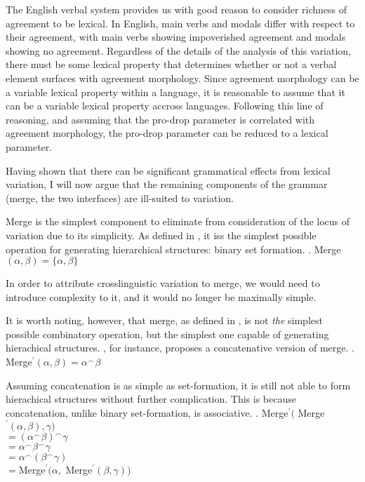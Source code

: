 \documentclass[MilwayThesis]{subfiles}
\begin{document}
The English verbal system provides us with good reason to consider richness of agreement to be lexical.
In English, main verbs and modals differ with respect to their agreement, with main verbs showing impoverished agreement and modals showing no agreement.
Regardless of the details of the analysis of this variation, there must be some lexical property that determines whether or not a verbal element surfaces with agreement morphology.
Since agreement morphology can be a variable lexical property within a language, it is reasonable to assume that it can be a variable lexical property accross languages.
Following this line of reasoning, and assuming that the pro-drop parameter is correlated with agreement morphology, the pro-drop parameter can be reduced to a lexical parameter.

Having shown that there can be significant grammatical effects from lexical variation, I will now argue that the remaining components of the grammar (merge, the two interfaces) are ill-suited to variation.

Merge is the simplest component to eliminate from consideration of the locus of variation due to its simplicity.
As defined in \Next, it iss the simplest possible operation for generating hierarchical structures: binary set formation.
\ex. Merge$(\alpha, \beta) = \{ \alpha, \beta\}$

In order to attribute crosslinguistic variation to merge, we would need to introduce complexity to it, and it would no longer be maximally simple.

It is worth noting, however, that merge, as defined in \Last, is not \textit{the} simplest possible combinatory operation, but the simplest one capable of generating hierachical structures.
\textcite{hornstein2009theory}, for instance, proposes a concatenative version of merge.
\ex. Merge$^\prime(\alpha, \beta) = \alpha^\frown\beta$

Assuming concatenation is as simple as set-formation, it is still not able to form hierachical structures without further complication.
This is because concatenation, unlike binary set-formation, is associative.
\ex. Merge$^\prime($ Merge$^\prime(\alpha, \beta), \gamma)$\\
$= (\alpha^\frown\beta)^\frown\gamma$\\
$= \alpha^\frown\beta^\frown\gamma$\\
$= \alpha^\frown(\beta^\frown\gamma)$\\
$= $Merge$^\prime(\alpha, $ Merge$^\prime(\beta, \gamma))$
\end{document}
